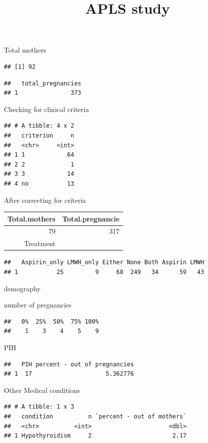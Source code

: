 \documentclass[
]{article}
\title{APLS study}
\author{}
\date{\vspace{-2.5em}}
\begin{document}
\maketitle

{
\setcounter{tocdepth}{2}
\tableofcontents
}
Total mothers

\begin{verbatim}
## [1] 92
\end{verbatim}

\begin{verbatim}
##   total_pregnancies
## 1               373
\end{verbatim}

Checking for clinical criteria

\begin{verbatim}
## # A tibble: 4 x 2
##   criterion     n
##   <chr>     <int>
## 1 1            64
## 2 2             1
## 3 3            14
## 4 no           13
\end{verbatim}

After correcting for criteria

\begin{longtable}[]{@{}rr@{}}
\toprule
Total.mothers & Total.pregnancie\tabularnewline
\midrule
\endhead
79 & 317\tabularnewline
Treatment &\tabularnewline
\bottomrule
\end{longtable}

\begin{verbatim}
##   Aspirin_only LMWH_only Either None Both Aspirin LMWH
## 1           25         9     68  249   34      59   43
\end{verbatim}

demography

number of pregnancies

\begin{verbatim}
##   0%  25%  50%  75% 100% 
##    1    3    4    5    9
\end{verbatim}

PIH

\begin{verbatim}
##   PIH percent - out of pregnancies
## 1  17                     5.362776
\end{verbatim}

Other Medical conditions

\begin{verbatim}
## # A tibble: 1 x 3
##   condition          n `percent - out of mothers`
##   <chr>          <int>                      <dbl>
## 1 Hypothyroidism     2                       2.17
\end{verbatim}
\end{document}

